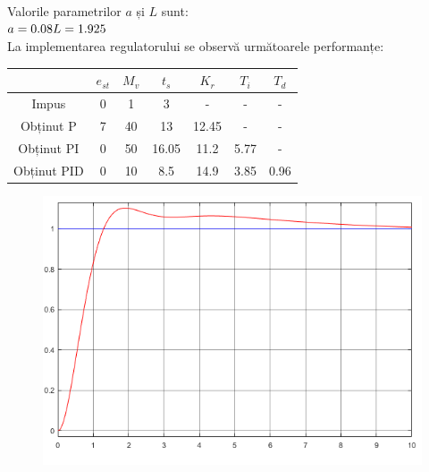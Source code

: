 \documentclass[11pt]{article}
\begin{document}
Valorile parametrilor $a$ și $L$ sunt:\\
$a=0.08\\
L=1.925$\\
La implementarea regulatorului se observă următoarele performanțe:
\begin{center}
	\begin{tabular}{|c|c|c|c|c|c|c|}
		\hline
		&$e_{st}$&$M_v$&$t_s$&$K_r$&$T_i$&$T_d$\\
		\hline
		Impus&0&1&3&-&-&-\\
		\hline
		Obținut P&7&40&13&12.45&-&-\\
		\hline
		Obținut PI&0&50&16.05&11.2&5.77&-\\
		\hline
		Obținut PID&0&10&8.5&14.9&3.85&0.96\\
		\hline
	\end{tabular}
\end{center}
\begin{figure}[H]
	\centering
	\includegraphics[width=.55\linewidth]{ZN.png}
	\label{fig:test2}
\end{figure}
\newpage
\end{document}
